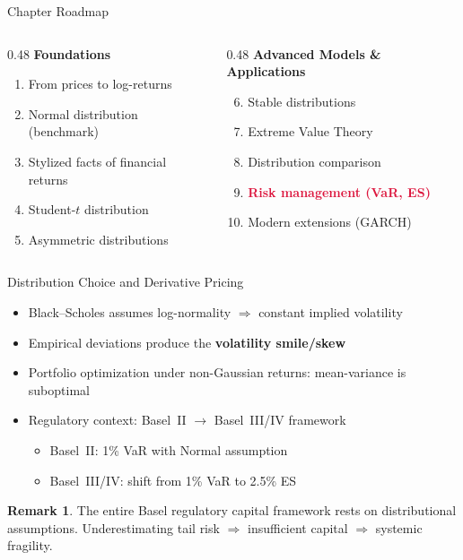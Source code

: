 \documentclass[9pt, aspectratio=169, t]{beamer}
\theoremstyle{definition}
\newtheorem{rmk}{Remark}
\begin{document}
\begin{frame}{Chapter Roadmap}
\begin{columns}[T]
\begin{column}{0.48\textwidth}
\textbf{Foundations}
\begin{enumerate}
\item From prices to log-returns
\item Normal distribution (benchmark)
\item Stylized facts of financial returns
\item Student-$t$ distribution
\item Asymmetric distributions
\end{enumerate}
\end{column}
\begin{column}{0.48\textwidth}
\textbf{Advanced Models \& Applications}
\begin{enumerate}\setcounter{enumi}{5}
\item Stable distributions
\item Extreme Value Theory
\item Distribution comparison
\item \textcolor{Crimson}{\textbf{Risk management (VaR, ES)}}
\item Modern extensions (GARCH)
\end{enumerate}
\end{column}
\end{columns}

\end{frame}

\begin{frame}{Distribution Choice and Derivative Pricing}
\begin{itemize}
\item Black--Scholes assumes log-normality $\Rightarrow$ constant implied volatility
\item Empirical deviations produce the \textbf{volatility smile/skew}
\item Portfolio optimization under non-Gaussian returns: mean-variance is suboptimal
\item Regulatory context: Basel~II $\to$ Basel~III/IV framework
\begin{itemize}
\item Basel~II: 1\% VaR with Normal assumption
\item Basel~III/IV: shift from 1\% VaR to 2.5\% ES
\end{itemize}
\end{itemize}

\vspace{0.3cm}
\begin{rmk}
The entire Basel regulatory capital framework rests on distributional assumptions. Underestimating tail risk $\Rightarrow$ insufficient capital $\Rightarrow$ systemic fragility.
\end{rmk}
\end{frame}
\end{document}
